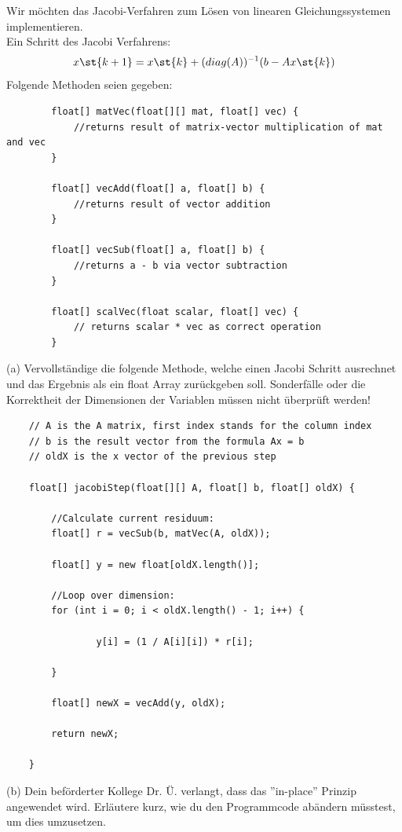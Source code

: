 \documentclass{scrartcl}
\begin{document}
	Wir möchten das Jacobi-Verfahren zum Lösen von linearen Gleichungssystemen implementieren. \\
	Ein Schritt des Jacobi Verfahrens:
	$$x\st{k+1} = x\st{k} + (diag(A))^{-1}(b - Ax\st{k})$$
	Folgende Methoden seien gegeben:
	\begin{lstlisting}
		float[] matVec(float[][] mat, float[] vec) {
			//returns result of matrix-vector multiplication of mat and vec
		}
		
		float[] vecAdd(float[] a, float[] b) {
			//returns result of vector addition
		}
		
		float[] vecSub(float[] a, float[] b) {
			//returns a - b via vector subtraction
		}
		
		float[] scalVec(float scalar, float[] vec) {
			// returns scalar * vec as correct operation
		}
	\end{lstlisting}
	\newpage
	(a) Vervollständige die folgende Methode, welche einen Jacobi Schritt ausrechnet und das Ergebnis als ein float Array zurückgeben soll.
	\n 
	Sonderfälle oder die Korrektheit der Dimensionen der Variablen müssen nicht überprüft werden! \n 
	\begin{lstlisting}
	// A is the A matrix, first index stands for the column index
	// b is the result vector from the formula Ax = b
	// oldX is the x vector of the previous step
	
	float[] jacobiStep(float[][] A, float[] b, float[] oldX) {
		
		//Calculate current residuum:
		float[] r = vecSub(b, matVec(A, oldX));
		
		float[] y = new float[oldX.length()];
		
		//Loop over dimension:
		for (int i = 0; i < oldX.length() - 1; i++) {
		
				y[i] = (1 / A[i][i]) * r[i];
		
		}
		
		float[] newX = vecAdd(y, oldX);
		
		return newX;
		
	}
	\end{lstlisting}
	\lbreak
	(b) Dein beförderter Kollege Dr. Ü. verlangt, dass das ''in-place'' Prinzip angewendet wird. Erläutere kurz, wie du den Programmcode abändern müsstest, um dies umzusetzen.
\end{document}
